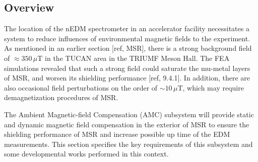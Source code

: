 \subsection{Overview}
The location of the nEDM spectrometer in an accelerator facility necessitates a system to reduce influences of environmental magnetic fields to the experiment. As mentioned in an earlier section [ref, MSR], there is a strong background field of $\approx 350\,\mu$T in the TUCAN area in the TRIUMF Meson Hall. The FEA simulations revealed that such a strong field could saturate the mu-metal layers of MSR, and worsen its shielding performance [ref, 9.4.1]. In addition, there are also occasional field perturbations on the order of $\sim 10\,\mu$T, which may require demagnetization procedures of MSR. 

The Ambient Magnetic-field Compensation (AMC) subsystem will provide static and dynamic magnetic field compensation in the exterior of MSR to ensure the shielding performance of MSR and increase possible  up time of the EDM measurements. This section specifies the key requirements of this subsystem and some developmental works performed in this context.  

